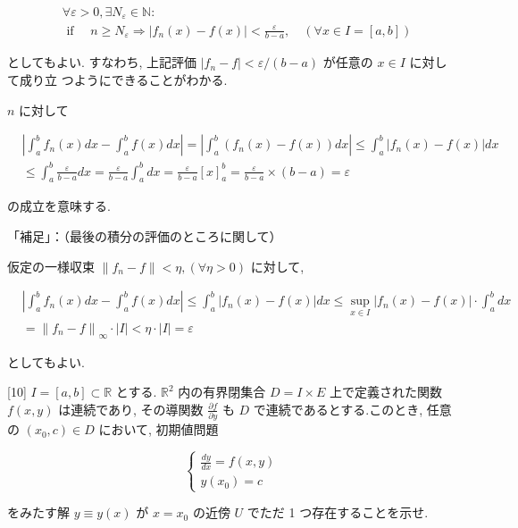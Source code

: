 \documentclass[10pt]{article}
\begin{document}
$$
\begin{aligned}
& \forall \varepsilon>0, \exists N_{\varepsilon} \in \mathbb{N}: \\
& \text { if } \quad n \geq N_{\varepsilon} \Rightarrow\left|f_{n}(x)-f(x)\right|<\frac{\varepsilon}{b-a}, \quad(\forall x \in I=[a, b])
\end{aligned}
$$

としてもよい. すなわち, 上記評価 $\left|f_{n}-f\right|<\varepsilon /(b-a)$ が任意の $x \in I$ に対して成り立 つようにできることがわかる.

$n$ に対して

$$
\begin{aligned}
& \left|\int_{a}^{b} f_{n}(x) d x-\int_{a}^{b} f(x) d x\right|=\left|\int_{a}^{b}\left(f_{n}(x)-f(x)\right) d x\right| \leqslant \int_{a}^{b}\left|f_{n}(x)-f(x)\right| d x \\
& \leqslant \int_{a}^{b} \frac{\varepsilon}{b-a} d x=\frac{\varepsilon}{b-a} \int_{a}^{b} d x=\frac{\varepsilon}{b-a}[x]_{a}^{b}=\frac{\varepsilon}{b-a} \times(b-a)=\varepsilon
\end{aligned}
$$

の成立を意味する.

「補足」：（最後の積分の評価のところに関して）

仮定の一様収束 $\left\|f_{n}-f\right\|<\eta,(\forall \eta>0)$ に対して,

$$
\begin{aligned}
& \left|\int_{a}^{b} f_{n}(x) d x-\int_{a}^{b} f(x) d x\right| \leqslant \int_{a}^{b}\left|f_{n}(x)-f(x)\right| d x \leqslant \sup _{x \in I}\left|f_{n}(x)-f(x)\right| \cdot \int_{a}^{b} d x \\
& =\left\|f_{n}-f\right\|_{\infty} \cdot|I|<\eta \cdot|I|=\varepsilon
\end{aligned}
$$

としてもよい.

[10] $I=[a, b] \subset \mathbb{R}$ とする. $\mathbb{R}^{2}$ 内の有界閉集合 $D=I \times E$ 上で定義された関数 $f(x, y)$ は連続であり, その導関数 $\frac{\partial f}{\partial y}$ も $D$ で連続であるとする.このとき, 任意の $\left(x_{0}, c\right) \in D$ において, 初期値問題

\[
\left\{\begin{array}{l}
\frac{d y}{d x}=f(x, y)  \tag{13}\\
y\left(x_{0}\right)=c
\end{array}\right.
\]

をみたす解 $y \equiv y(x)$ が $x=x_{0}$ の近傍 $U$ でただ 1 つ存在することを示せ.
\end{document}
